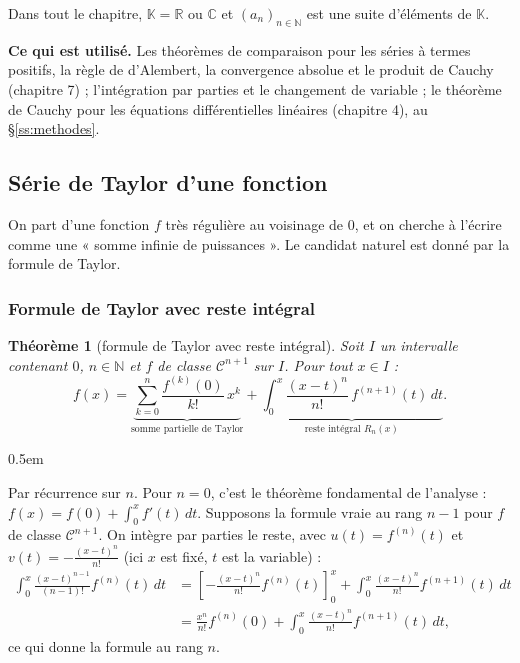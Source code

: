 \documentclass[a4paper,11pt]{article}
\makeatletter
\numberwithin{equation}{section}
\numberwithin{figure}{section}
\numberwithin{table}{section}
\theoremstyle{enonce}
\newtheorem{theoreme}[definition]{Théorème}
\theoremstyle{exemple}
\theoremstyle{remarque}
\renewcommand{\proofname}{Démonstration}
\renewenvironment{proof}[1][\proofname]{\par\pushQED{\qed}\normalfont
  \topsep0.5em\relax\trivlist\item[\hskip\labelsep\sffamily\itshape\color{Gris}#1.]\ignorespaces}
  {\popQED\endtrivlist\@endpefalse}
\newcommand{\K}{\mathbb{K}}
\newcommand{\R}{\mathbb{R}}
\newcommand{\C}{\mathbb{C}}
\newcommand{\N}{\mathbb{N}}
\makeatother
\begin{document}
Dans tout le chapitre, $\K=\R$ ou $\C$ et $(a_n)_{n\in\N}$ est une suite d'éléments de $\K$.

\begin{commencer}
\textbf{Ce qui est utilisé.} Les théorèmes de comparaison pour les séries à termes positifs, la règle de d'Alembert, la
convergence absolue et le produit de Cauchy (chapitre 7) ; l'intégration par parties et le changement de variable ; le théorème
de Cauchy pour les équations différentielles linéaires (chapitre 4), au §\ref{ss:methodes}.
\end{commencer}

\subsection{Série de Taylor d'une fonction}\label{ss:taylor}

On part d'une fonction $f$ très régulière au voisinage de $0$, et on cherche à l'écrire comme une « somme infinie de
puissances ». Le candidat naturel est donné par la formule de Taylor.

\subsubsection*{Formule de Taylor avec reste intégral}

\begin{theoreme}[formule de Taylor avec reste intégral]\label{t:taylor}
Soit $I$ un intervalle contenant $0$, $n\in\N$ et $f$ de classe $\mathcal C^{n+1}$ sur $I$. Pour tout $x\in I$ :
\[f(x)=\underbrace{\sum_{k=0}^n\frac{f^{(k)}(0)}{k!}\,x^k}_{\text{somme partielle de Taylor}}+\underbrace{\int_0^x\frac{(x-t)^n}{n!}\,f^{(n+1)}(t)\,dt}_{\text{reste intégral }R_n(x)}.\]
\end{theoreme}

\begin{proof}
Par récurrence sur $n$. Pour $n=0$, c'est le théorème fondamental de l'analyse : $f(x)=f(0)+\int_0^xf'(t)\,dt$.
Supposons la formule vraie au rang $n-1$ pour $f$ de classe $\mathcal C^{n+1}$. On intègre par parties le reste, avec
$u(t)=f^{(n)}(t)$ et $v(t)=-\frac{(x-t)^n}{n!}$ (ici $x$ est fixé, $t$ est la variable) :
\begin{align*}\int_0^x\frac{(x-t)^{n-1}}{(n-1)!}f^{(n)}(t)\,dt&=\left[-\frac{(x-t)^n}{n!}f^{(n)}(t)\right]_0^x+\int_0^x\frac{(x-t)^n}{n!}f^{(n+1)}(t)\,dt\\
&=\frac{x^n}{n!}f^{(n)}(0)+\int_0^x\frac{(x-t)^n}{n!}f^{(n+1)}(t)\,dt,\end{align*}
ce qui donne la formule au rang $n$.
\end{proof}
\end{document}
